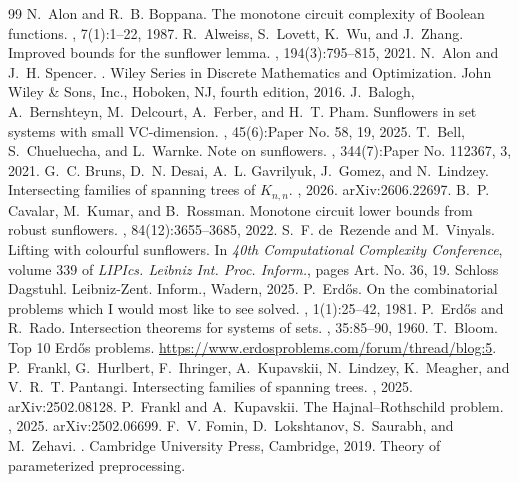 \documentclass[10pt,a4paper]{amsart}
\begin{document}
\begin{thebibliography}{99}
 N.~Alon and R.~B. Boppana. \newblock The monotone circuit complexity of {B}oolean functions. , 7(1):1--22, 1987.
 R.~Alweiss, S.~Lovett, K.~Wu, and J.~Zhang. \newblock Improved bounds for the sunflower lemma. , 194(3):795--815, 2021.
 N.~Alon and J.~H. Spencer. . \newblock Wiley Series in Discrete Mathematics and Optimization. John Wiley \& Sons, Inc., Hoboken, NJ, fourth edition, 2016.
 J.~Balogh, A.~Bernshteyn, M.~Delcourt, A.~Ferber, and H.~T. Pham. \newblock Sunflowers in set systems with small {VC}-dimension. , 45(6):Paper No. 58, 19, 2025.
 T.~Bell, S.~Chueluecha, and L.~Warnke. \newblock Note on sunflowers. , 344(7):Paper No. 112367, 3, 2021.
 G.~C. Bruns, D.~N. Desai, A.~L. Gavrilyuk, J.~Gomez, and N.~Lindzey. \newblock Intersecting families of spanning trees of {$K_{n,n}$}. , 2026. \newblock arXiv:2606.22697.
 B.~P. Cavalar, M.~Kumar, and B.~Rossman. \newblock Monotone circuit lower bounds from robust sunflowers. , 84(12):3655--3685, 2022.
 S.~F. de~Rezende and M.~Vinyals. \newblock Lifting with colourful sunflowers. \newblock In {\em 40th {C}omputational {C}omplexity {C}onference}, volume 339 of {\em LIPIcs. Leibniz Int. Proc. Inform.}, pages Art. No. 36, 19. Schloss Dagstuhl. Leibniz-Zent. Inform., Wadern, 2025.
 P.~Erd\H{o}s. \newblock On the combinatorial problems which {I} would most like to see solved. , 1(1):25--42, 1981.
 P.~Erd\H{o}s and R.~Rado. \newblock Intersection theorems for systems of sets. , 35:85--90, 1960.
 T.~Bloom. \newblock Top 10 {E}rd{\H{o}}s problems. \newblock \url{https://www.erdosproblems.com/forum/thread/blog:5}.
 P.~Frankl, G.~Hurlbert, F.~Ihringer, A.~Kupavskii, N.~Lindzey, K.~Meagher, and V.~R.~T. Pantangi. \newblock Intersecting families of spanning trees. , 2025. \newblock arXiv:2502.08128.
 P.~Frankl and A.~Kupavskii. \newblock The {Hajnal--Rothschild} problem. , 2025. \newblock arXiv:2502.06699.
 F.~V. Fomin, D.~Lokshtanov, S.~Saurabh, and M.~Zehavi. . \newblock Cambridge University Press, Cambridge, 2019. \newblock Theory of parameterized preprocessing.

\end{thebibliography}
\end{document}
